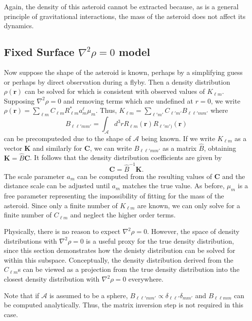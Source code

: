 \documentclass[11pt]{article}
\begin{document}
Again, the density of this asteroid cannot be extracted because, as is a general principle of gravitational interactions, the mass of the asteroid does not affect its dynamics.

\subsection{Fixed Surface $\nabla^2 \rho = 0$ model}
Now suppose the shape of the asteroid is known, perhaps by a simplifying guess or perhaps by direct observation during a flyby. Then a density distribution $\rho(\bm r)$ can be solved for which is consistent with observed values of $K_{\ell m}$. Supposing $\nabla^2 \rho = 0$ and removing terms which are undefined at $r=0$, we write $\rho(\bm r) = \sum_{\ell m} C_{\ell m} R_{\ell m}^* a_m^\ell \mu_m$. Thus, $K_{\ell m} = \sum_{\ell' m'} C_{\ell' m'} B_{\ell \ell' m m'}$ where
\begin{equation}
  B_{\ell \ell' m m'} = \int_{\mathcal{A}}d^3 r R_{\ell m}(\bm r) R_{\ell' m')}(\bm r)
  \label{eqn:blm}
\end{equation}
can be precomputeded due to the shape of $\mathcal{A}$ being known.
If we write $K_{\ell m}$ as a vector $\bm K$ and similarly for $\bm C$, we can write $B_{\ell \ell' m m'}$ as a matrix $\hat B$, obtaining $\bm K = \hat B \bm C$. It follows that the density distribution coefficients are given by
\begin{equation}
\bm C = \hat B^{-1} \bm K.
\end{equation}
The scale parameter $a_m$ can be computed from the resulting values of $\bm C$ and the distance scale can be adjusted until $a_m$ matches the true value. As before, $\mu_m$ is a free parameter representing the impossibility of fitting for the mass of the asteroid. Since only a finite number of $K_{\ell m}$ are known, we can only solve for a finite number of $C_{\ell m}$ and neglect the higher order terms.

Physically, there is no reason to expect $\nabla^2 \rho = 0$. However, the space of density distributions with $\nabla^2 \rho = 0$ is a useful proxy for the true density distribution, since this section demonstrates how the denisty distribution can be solved for within this subspace. Conceptually, the density distribution derived from the $C_{\ell m}$s can be viewed as a projection from the true density distribution into the closest density distribution with $\nabla^2 \rho = 0$ everywhere.

Note that if $\mathcal{A}$ is assumed to be a sphere, $B_{\ell \ell' m m'} \propto \delta_{\ell \ell'} \delta_{m m'}$ and $B_{\ell \ell m m}$ can be computed analytically. Thus, the matrix inversion step is not required in this case.
\end{document}
